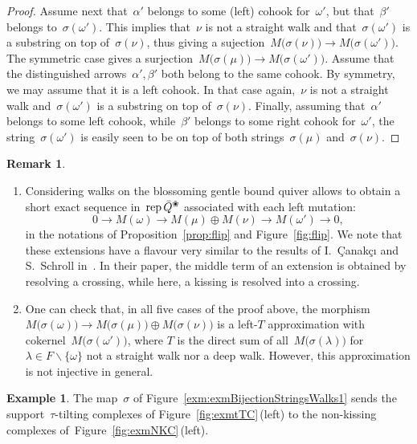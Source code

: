 \documentclass{amsart}
\theoremstyle{definition}
\newtheorem{example}[theorem]{Example}
\newtheorem{remark}[theorem]{Remark}
\newcommand{\ssm}{\smallsetminus} %
\newcommand{\fref}[1]{Figure~\ref{#1}} %
\newcommand{\blossom}{^\text{\ding{96}}} %
\newcommand{\rep}{\operatorname{{\rm rep}}}
\begin{document}
\begin{proof}
Assume next that~$\alpha'$ belongs to some (left) cohook for~$\omega'$, but that~$\beta'$ belongs to~$\sigma(\omega')$.
This implies that~$\nu$ is not a straight walk and that~$\sigma(\omega')$ is a substring on top of~$\sigma(\nu)$, thus giving a sujection~$M \big( \sigma(\nu) \big) \rightarrow M \big( \sigma(\omega') \big)$.
The symmetric case gives a surjection~$M \big( \sigma(\mu) \big) \rightarrow M \big( \sigma(\omega') \big)$.
Assume that the distinguished arrows~$\alpha', \beta'$ both belong to the same cohook.
By symmetry, we may assume that it is a left cohook.
In that case again,~$\nu$ is not a straight walk and~$\sigma(\omega')$ is a substring on top of~$\sigma(\nu)$.
Finally, assuming that~$\alpha'$ belongs to some left cohook, while~$\beta'$ belongs to some right cohook for~$\omega'$, the string~$\sigma(\omega')$ is easily seen to be on top of both strings~$\sigma(\mu)$ and~$\sigma(\nu)$.
\end{proof}


\begin{remark}
\begin{enumerate}
\item Considering walks on the blossoming gentle bound quiver allows to obtain a short exact sequence in~$\rep \bar Q\blossom$ associated with each left mutation:
\[
0\rightarrow M(\omega) \rightarrow M(\mu) \oplus M(\nu) \rightarrow M(\omega') \rightarrow 0,
\]
in the notations of Proposition~\ref{prop:flip} and Figure~\ref{fig:flip}.
We note that these extensions have a flavour very similar to the results of I.~\c{C}anak\c{c}{\i} and S.~Schroll in~\cite{CanakciSchroll}.
In their paper, the middle term of an extension is obtained by resolving a crossing, while here, a kissing is resolved into a crossing.
\item One can check that, in all five cases of the proof above, the morphism $M \big( \sigma(\omega) \big) \rightarrow M \big( \sigma(\mu) \big) \oplus M \big( \sigma(\nu) \big)$ is a left-$T$ approximation with cokernel~$M \big( \sigma(\omega') \big)$, where $T$ is the direct sum of all~$M \big( \sigma(\lambda) \big)$ for $\lambda \in F \ssm \{\omega\}$ not a straight walk nor a deep walk.
 However, this approximation is not injective in general.
\end{enumerate}
\end{remark}


\begin{example}
The map~$\sigma$ of \fref{exm:exmBijectionStringsWalks1} sends the support~$\tau$-tilting complexes of \fref{fig:exmtTC}\,(left) to the non-kissing complexes of~\fref{fig:exmNKC}\,(left).
\end{example}
\end{document}
